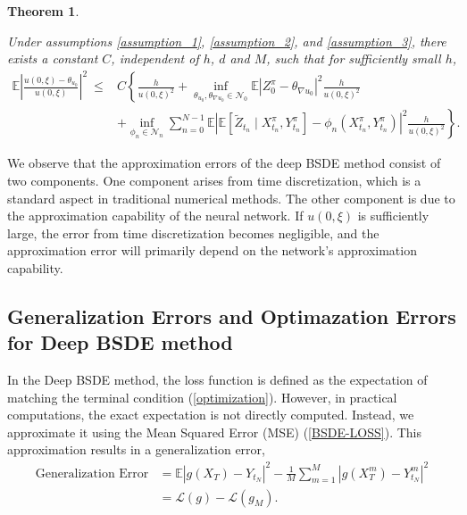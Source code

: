 \documentclass[11pt]{article}
\newtheorem{theorem}{Theorem}
\begin{document}
\begin{theorem}\label{theorem_1}

Under assumptions \ref{assumption_1}, \ref{assumption_2}, and \ref{assumption_3}, there exists a constant $C$, independent of $h$, $d$ and $M$, such that for sufficiently small $h$,
\begin{equation}\label{th1}
	\begin{aligned}
	\mathbb{E}\left|\frac{{u(0, \xi)-\theta_{{u_0}}}}{{u(0,\xi)}}  \right|^2\
	 \leq &C\left\{ \frac{h}{u(0,\xi)^2} +\inf _{\theta_{{u_0}},\theta_{\nabla{u_0}} \in \mathcal{N}_0}  \mathbb{E}\left| Z_0^\pi-\theta_{\nabla{u_0}} \right|^2  \frac{h}{u(0,\xi)^2} \right.\\
	&\left. +  \inf _{\phi_n \in \mathcal{N}_n} \sum_{n=0}^{N-1} \mathbb{E}\left|\mathbb{E}\left[\tilde{Z}_{t_n} \mid X_{t_n}^\pi, Y_{t_n}^\pi\right]-\phi_n\left(X_{t_n}^\pi, Y_{t_n}^\pi\right)\right|^2 \frac{h}{u(0,\xi)^2}\right\}.
	\end{aligned}
\end{equation}

\end{theorem}
We observe that the approximation errors of the deep BSDE method consist of two components. One component arises from time discretization, which is a standard aspect in traditional numerical methods. The other component is due to the approximation capability of the neural network. If $u(0,\xi)$ is sufficiently large, the error from time discretization becomes negligible, and the approximation error will primarily depend on the network's approximation capability.


\subsection{Generalization Errors and Optimazation Errors for Deep BSDE method}
In the Deep BSDE method, the loss function is defined as the expectation of matching the terminal condition (\ref{optimization}). However, in practical computations, the exact expectation is not directly computed. Instead, we approximate it using the Mean Squared Error (MSE) (\ref{BSDE-LOSS}). This approximation results in a generalization error,
\begin{equation}\label{Generalization_Error}
	\begin{aligned}
	\text{Generalization Error}  &	=\mathbb{E} {{\left| {g \left( {{X}_T} \right) - Y_{t_N} } \right|}^2}  - \frac{1}{M}\sum\limits_{m = 1}^M {{{\left| {g\left( {{X_T^m}} \right) -  Y_{{t_N}}^m } \right|}^2}}\\
	& =\mathcal{L}  \left( g \right) - \mathcal{L} \left( g_M \right).
	\end{aligned}
\end{equation}
\end{document}
